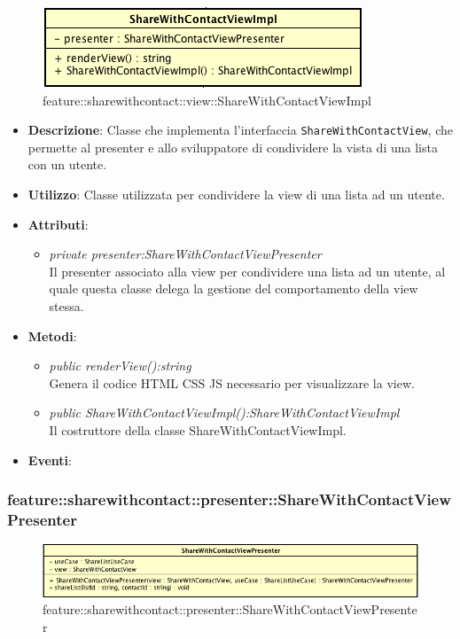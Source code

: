 \label{feature::sharewithcontact::view::ShareWithContactViewImpl}
\begin{figure}[ht]
	\centering
	\includegraphics[scale=0.5]{Sezioni/SottosezioniST/img/app/ShareWithContactViewImpl.png}
	\caption{feature::sharewithcontact::view::ShareWithContactViewImpl}
\end{figure}

\begin{itemize}
\item \textbf{Descrizione}: Classe che implementa l'interfaccia \texttt{ShareWithContactView}, che permette al presenter e allo sviluppatore di condividere la vista di una lista con un utente.
\item \textbf{Utilizzo}: Classe utilizzata per condividere la view di una lista ad un utente.
\item \textbf{Attributi}: 
\begin{itemize}
\item \textit{private presenter:ShareWithContactViewPresenter}\\
	Il presenter associato alla view per condividere una lista ad un utente, al quale questa classe delega la gestione del comportamento della view stessa.
\end{itemize}
\item \textbf{Metodi}:
\begin{itemize}
\item \textit{public renderView():string}\\
	Genera il codice HTML CSS JS necessario per visualizzare la view.
\item \textit{public ShareWithContactViewImpl():ShareWithContactViewImpl}\\
	Il costruttore della classe ShareWithContactViewImpl.
\end{itemize}
\item \textbf{Eventi}:
\end{itemize}

\subsubsection{feature::sharewithcontact::presenter::ShareWithContactViewPresenter}

\label{feature::sharewithcontact::presenter::ShareWithContactViewPresenter}
\begin{figure}[ht]
	\centering
	\includegraphics[scale=0.5]{Sezioni/SottosezioniST/img/app/ShareWithContactViewPresenter.png}
	\caption{feature::sharewithcontact::presenter::ShareWithContactViewPresenter}
\end{figure}

